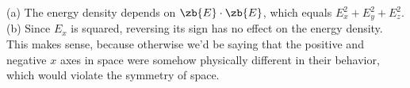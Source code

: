 (a) The energy density depends on $\zb{E}\cdot\zb{E}$, which equals
$E_x^2+E_y^2+E_z^2$.\\ (b) Since $E_x$ is squared, reversing its sign
has no effect on the energy density. This makes sense, because
otherwise we'd be saying that the positive and negative $x$ axes in
space were somehow physically different in their behavior, which
would violate the symmetry of space.

